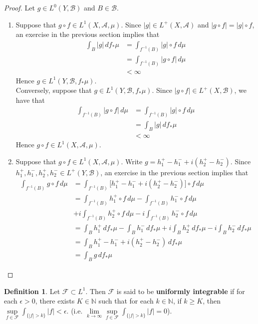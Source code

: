 \documentclass[12pt]{amsart}
\theoremstyle{definition}
\newtheorem{defn}[definition]{Definition}
\newcommand{\ep}{\epsilon}
\newcommand{\N}{\mathbb{N}}
\newcommand{\MA}{\mathcal{A}}
\newcommand{\MB}{\mathcal{B}}
\newcommand{\MF}{\mathcal{F}}
\newcommand{\dmu}{\, d \mu}
\newcommand{\ld}[1]{\label{defn:#1}}
\begin{document}
	\begin{proof} Let $g \in L^0(Y, \MB)$ and $B \in \MB$.
		\begin{enumerate}
			\item Suppose that $g \circ f \in L^1(X, \MA, \mu)$. Since $|g| \in L^+(X, \MA)$ and $|g \circ f| = |g| \circ f$, an exercise in the previous section implies that 
			\begin{align*}
				\int_B |g|  \, d f_*\mu  
				& = \int_{f^{-1}(B)} |g| \circ f \dmu \\
				& = \int_{f^{-1}(B)} |g \circ f| \dmu \\
				& < \infty 
			\end{align*}
			Hence $g \in L^1(Y, \MB, f_*\mu)$. \\
			Conversely, suppose that $g \in L^1(Y, \MB, f_*\mu)$. Since $|g \circ f| \in L^+(X, \MB)$, we have that 
			\begin{align*}
				\int_{f^{-1}(B)} |g \circ f| \dmu   
				& = \int_{f^{-1}(B)} |g| \circ f \dmu \\
				& = \int_B |g|  \, d f_*\mu \\
				& < \infty 
			\end{align*}
			Hence $g \circ f \in L^1(X, \MA, \mu)$. \\
			\item Suppose that $g \circ f \in L^1(X, \MA, \mu)$. Write $g = h_1^+ - h_1^- + i(h_2^+ - h_2^-)$. Since $h_1^+, h_1^-, h_2^+, h_2^- \in L^+(Y, \MB)$, an exercise in the previous section implies that 
			\begin{align*}
				\int_{f^{-1}(B)} g \circ f \dmu
				& = \int_{f^{-1}(B)} \bigg[ h_1^+ - h_1^- + i(h_2^+ - h_2^-) \bigg] \circ f \dmu \\
				& = \int_{f^{-1}(B)}  h_1^+ \circ f \dmu - \int_{f^{-1}(B)}  h_1^- \circ f \dmu \\
				& + i \int_{f^{-1}(B)} h_2^+ \circ f \dmu -i \int_{f^{-1}(B)}  h_2^- \circ f \dmu \\
				& = \int_B h_1^+ \, d f_*\mu - \int_B h_1^- \, d f_*\mu + i \int_B h_2^+ \, d f_*\mu - i \int_B h_2^- \, d f_*\mu \\
				& = \int_B  h_1^+ - h_1^- + i(h_2^+ - h_2^-)  \, d f_*\mu \\
				& = \int_B g \, d f_*\mu
			\end{align*}
		\end{enumerate}
	\end{proof}
	
	\begin{defn} \ld{00000} 
		Let $\MF \subset L^1$. Then $\MF$ is said to be \textbf{uniformly integrable} if for each $\ep >0$, there exists $K \in \N$ such that for each $k \in \N$, if $k \geq K$, then $\sup\limits_{f \in \MF} \int_{\{|f|>k\}}|f| < \ep$. (i.e. $\lim\limits_{k \rightarrow \infty} \sup\limits_{f \in \MF} \int_{\{|f| > k\}} |f| = 0$).
	\end{defn}
	
\end{document}
